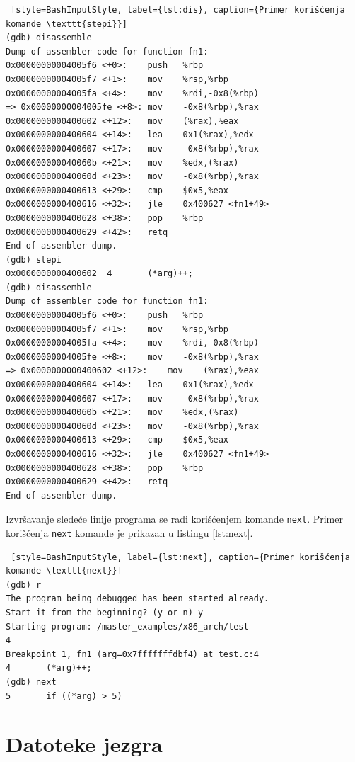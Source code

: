 \documentclass[12pt,oneside]{memoir}
\begin{document}
\begin{description}
\begin{lstlisting} [style=BashInputStyle, label={lst:dis}, caption={Primer korišćenja komande \texttt{stepi}}]
(gdb) disassemble
Dump of assembler code for function fn1:
0x00000000004005f6 <+0>:	push   %rbp
0x00000000004005f7 <+1>:	mov    %rsp,%rbp
0x00000000004005fa <+4>:	mov    %rdi,-0x8(%rbp)
=> 0x00000000004005fe <+8>:	mov    -0x8(%rbp),%rax
0x0000000000400602 <+12>:	mov    (%rax),%eax
0x0000000000400604 <+14>:	lea    0x1(%rax),%edx
0x0000000000400607 <+17>:	mov    -0x8(%rbp),%rax
0x000000000040060b <+21>:	mov    %edx,(%rax)
0x000000000040060d <+23>:	mov    -0x8(%rbp),%rax
0x0000000000400613 <+29>:	cmp    $0x5,%eax
0x0000000000400616 <+32>:	jle    0x400627 <fn1+49>
0x0000000000400628 <+38>:	pop    %rbp
0x0000000000400629 <+42>:	retq   
End of assembler dump.
(gdb) stepi
0x0000000000400602	4		(*arg)++;
(gdb) disassemble 
Dump of assembler code for function fn1:
0x00000000004005f6 <+0>:	push   %rbp
0x00000000004005f7 <+1>:	mov    %rsp,%rbp
0x00000000004005fa <+4>:	mov    %rdi,-0x8(%rbp)
0x00000000004005fe <+8>:	mov    -0x8(%rbp),%rax
=> 0x0000000000400602 <+12>:	mov    (%rax),%eax
0x0000000000400604 <+14>:	lea    0x1(%rax),%edx
0x0000000000400607 <+17>:	mov    -0x8(%rbp),%rax
0x000000000040060b <+21>:	mov    %edx,(%rax)
0x000000000040060d <+23>:	mov    -0x8(%rbp),%rax
0x0000000000400613 <+29>:	cmp    $0x5,%eax
0x0000000000400616 <+32>:	jle    0x400627 <fn1+49>
0x0000000000400628 <+38>:	pop    %rbp
0x0000000000400629 <+42>:	retq   
End of assembler dump.
\end{lstlisting}

Izvršavanje sledeće linije programa se radi korišćenjem komande \texttt{next}. Primer korišćenja \texttt{next} komande je prikazan u listingu \ref{lst:next}.

\begin{lstlisting} [style=BashInputStyle, label={lst:next}, caption={Primer korišćenja komande \texttt{next}}]
(gdb) r
The program being debugged has been started already.
Start it from the beginning? (y or n) y
Starting program: /master_examples/x86_arch/test 
4
Breakpoint 1, fn1 (arg=0x7fffffffdbf4) at test.c:4
4		(*arg)++;
(gdb) next
5	    if ((*arg) > 5)
\end{lstlisting}

\end{description}


\section{Datoteke jezgra}
\end{document}
